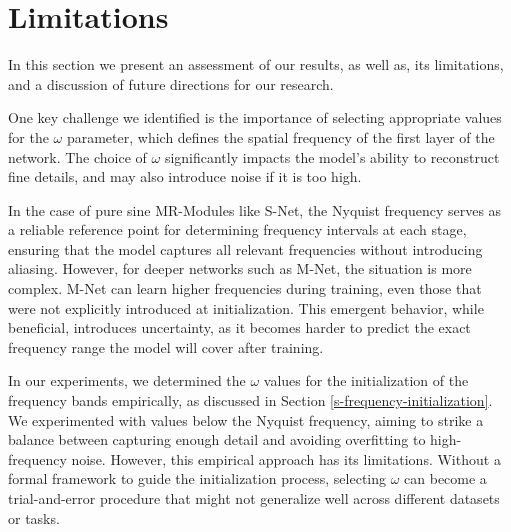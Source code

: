 

\section{Limitations}

In this section we present an assessment of our results, as well as, its limitations, and a discussion of future directions for our research.

One key challenge we identified is the importance of selecting appropriate values for the $\omega$ parameter, which defines the spatial frequency of the first layer of the network. The choice of $\omega$ significantly impacts the model's ability to reconstruct fine details, and may also introduce noise if it is too high.

In the case of pure sine MR-Modules like S-Net, the Nyquist frequency serves as a reliable reference point for determining frequency intervals at each stage, ensuring that the model captures all relevant frequencies without introducing aliasing. However, for deeper networks such as M-Net, the situation is more complex. M-Net can learn higher frequencies during training, even those that were not explicitly introduced at initialization. This emergent behavior, while beneficial, introduces uncertainty, as it becomes harder to predict the exact frequency range the model will cover after training.


In our experiments, we determined the $\omega$ values for the initialization of the frequency bands empirically, as discussed in Section \ref{s-frequency-initialization}. We experimented with values below the Nyquist frequency, aiming to strike a balance between capturing enough detail and avoiding overfitting to high-frequency noise. However, this empirical approach has its limitations. Without a formal framework to guide the initialization process, selecting $\omega$ can become a trial-and-error procedure that might not generalize well across different datasets or tasks.

